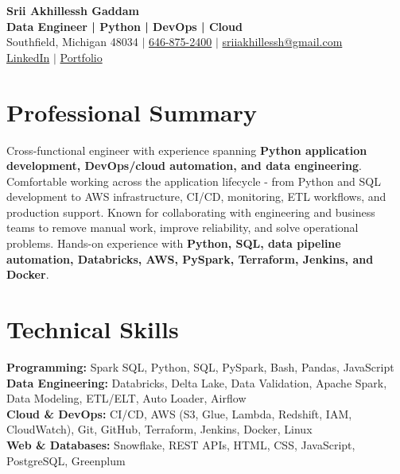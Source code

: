\documentclass[letterpaper,10pt]{article}
\begin{document}
\fontsize{9.35pt}{10.45pt}\selectfont

\begin{center}
    {\LARGE \textbf{Srii Akhillessh Gaddam}} \\[-1pt]
    \textbf{Data Engineer | Python | DevOps | Cloud} \\[2pt]
    Southfield, Michigan 48034 $|$
    \href{tel:6468752400}{646-875-2400} $|$
    \href{mailto:sriiakhillessh@gmail.com}{sriiakhillessh@gmail.com} \\[1pt]
    \href{https://www.linkedin.com/in/srii-akhiilessh-gaddam-b48668191/}{LinkedIn} $|$
    \href{https://sriiakhillesshg.github.io/portfolio/}{Portfolio}
\end{center}
\vspace{-8pt}

\section{Professional Summary}
\small{Cross-functional engineer with experience spanning \textbf{Python application development, DevOps/cloud automation, and data engineering}. Comfortable working across the application lifecycle - from Python and SQL development to AWS infrastructure, CI/CD, monitoring, ETL workflows, and production support. Known for collaborating with engineering and business teams to remove manual work, improve reliability, and solve operational problems. Hands-on experience with \textbf{Python, SQL, data pipeline automation, Databricks, AWS, PySpark, Terraform, Jenkins, and Docker}.}

\section{Technical Skills}
\small{
\textbf{Programming:} Spark SQL, Python, SQL, PySpark, Bash, Pandas, JavaScript \\
\textbf{Data Engineering:} Databricks, Delta Lake, Data Validation, Apache Spark, Data Modeling, ETL/ELT, Auto Loader, Airflow \\
\textbf{Cloud \& DevOps:} CI/CD, AWS (S3, Glue, Lambda, Redshift, IAM, CloudWatch), Git, GitHub, Terraform, Jenkins, Docker, Linux \\
\textbf{Web \& Databases:} Snowflake, REST APIs, HTML, CSS, JavaScript, PostgreSQL, Greenplum
}

\end{document}
